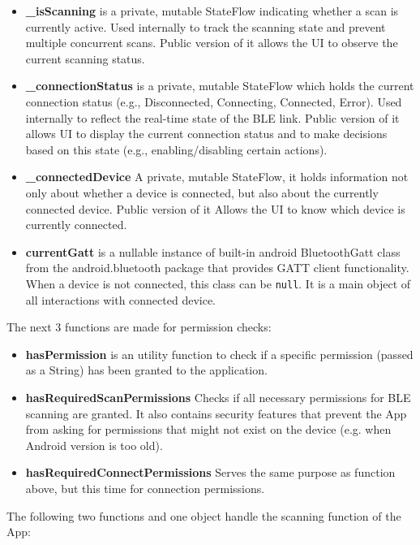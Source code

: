 \begin{itemize}
	\item \textbf{\_isScanning} is a private, mutable StateFlow indicating whether a scan is currently active. Used internally to track the scanning state and prevent multiple concurrent scans. Public version of it allows the UI to observe the current scanning status.
	\item \textbf{\_connectionStatus} is a private, mutable StateFlow which holds the current connection status (e.g., Disconnected, Connecting, Connected, Error). Used internally to reflect the real-time state of the \ac{BLE} link. Public version of it allows UI to display the current connection status and to make decisions based on this state (e.g., enabling/disabling certain actions).
	\item \textbf{\_connectedDevice} A private, mutable StateFlow, it holds information not only about whether a device is connected, but also about the currently connected device. Public version of it Allows the UI to know which device is currently connected.
	\item \textbf{currentGatt} is a nullable instance of built-in android BluetoothGatt class from the android.bluetooth package\cite{android_bluetooth} that provides \ac{GATT} client functionality. When a device is not connected, this class can be \texttt{null}. It is a main object of all interactions with connected device.
\end{itemize}
The next 3 functions are made for permission checks:
\begin{itemize}
	\item \textbf{hasPermission} is an utility function to check if a specific permission (passed as a String) has been granted to the application.
	\item \textbf{hasRequiredScanPermissions} Checks if all necessary permissions for \ac{BLE} scanning are granted. It also contains security features that prevent the App from asking for permissions that might not exist on the device (e.g. when Android version is too old).
	\item \textbf{hasRequiredConnectPermissions} Serves the same purpose as function above, but this time for connection permissions.
\end{itemize}
The following two functions and one object handle the scanning function of the App:
